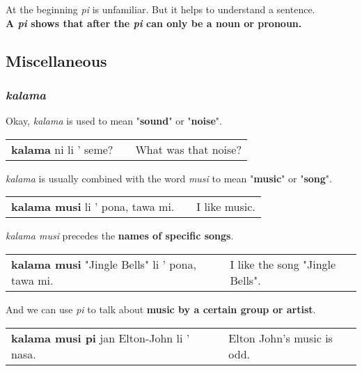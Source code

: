 At the beginning \textit{pi} is unfamiliar. 
But it helps to understand a sentence. \\
\textbf{A \textit{pi} shows that after the \textit{pi} can only be a noun or pronoun.}

%
\newpage
\subsection*{Miscellaneous}
%
\subsubsection*{\textit{kalama}}
%
Okay, \textit{kalama} is used to mean "\textbf{sound}" or "\textbf{noise}".  \\
\begin{supertabular}{p{5,5cm}|ll}
\textbf{kalama} ni li ' seme? && What was that noise? \\
\end{supertabular}  

\textit{kalama} is usually combined with the word \textit{musi} to mean "\textbf{music}" or "\textbf{song}". \\
\begin{supertabular}{p{5,5cm}|ll}
\textbf{kalama musi} li ' pona, tawa mi. && I like music. \\
\end{supertabular}  

\textit{kalama musi} precedes the \textbf{names of specific songs}. \\
\begin{supertabular}{p{5,5cm}|ll}
\textbf{kalama musi} "Jingle Bells" li ' pona, tawa mi. && I like the song "Jingle Bells". \\
\end{supertabular}  

And we can use \textit{pi} to talk about \textbf{music by a certain group or artist}. \\
\begin{supertabular}{p{5,5cm}|ll}
\textbf{kalama musi pi} jan Elton-John li ' nasa. && Elton John's music is odd. \\
\end{supertabular}  

